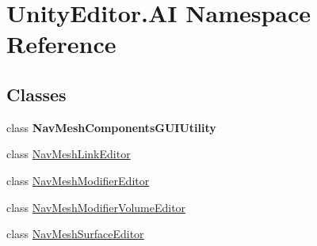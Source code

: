 \hypertarget{namespace_unity_editor_1_1_a_i}{}\section{Unity\+Editor.\+AI Namespace Reference}
\label{namespace_unity_editor_1_1_a_i}
\subsection*{Classes}
\begin{DoxyCompactItemize}
\item 
class {\bfseries Nav\+Mesh\+Components\+G\+U\+I\+Utility}
\item 
class \mbox{\hyperlink{class_unity_editor_1_1_a_i_1_1_nav_mesh_link_editor}{Nav\+Mesh\+Link\+Editor}}
\item 
class \mbox{\hyperlink{class_unity_editor_1_1_a_i_1_1_nav_mesh_modifier_editor}{Nav\+Mesh\+Modifier\+Editor}}
\item 
class \mbox{\hyperlink{class_unity_editor_1_1_a_i_1_1_nav_mesh_modifier_volume_editor}{Nav\+Mesh\+Modifier\+Volume\+Editor}}
\item 
class \mbox{\hyperlink{class_unity_editor_1_1_a_i_1_1_nav_mesh_surface_editor}{Nav\+Mesh\+Surface\+Editor}}
\end{DoxyCompactItemize}
